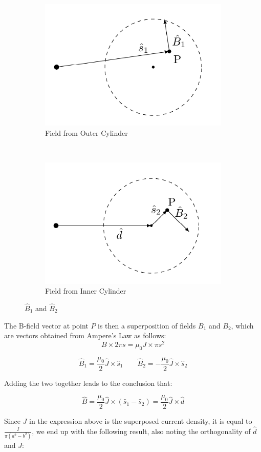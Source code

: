 \documentclass{article}
\begin{document}
\begin{figure}[ht!]
    \centering
    \begin{subfigure}[b]{0.5\textwidth}
        \centering
        \includegraphics[width=0.5\linewidth]{figures/vec1.png}
        \caption{Field from Outer Cylinder}
    \end{subfigure}%
    ~ 
    \begin{subfigure}[b]{0.5\textwidth}
        \centering
        \includegraphics[width=0.5\linewidth]{figures/vec2.png}
        \caption{Field from Inner Cylinder}
    \end{subfigure}
    \caption{$\hat{B}_1$ and $\hat{B}_2$}
\end{figure}

\newpage

 The B-field vector at point $P$ is then a superposition of fields $B_1$ and $B_2$, which are vectors obtained from Ampere's Law as follows:
\[
B\times 2\pi s = \mu_0 J \times \pi s^2 
\]

\[
\hat{B}_1 = \frac{\mu_0}{2} \hat{J}\times \hat{s}_1 \qquad \hat{B}_2 = -\frac{\mu_0}{2} \hat{J} \times \hat{s}_2
\]

Adding the two together leads to the conclusion that:

\[
\hat{B} = \frac{\mu_0}{2}\hat{J} \times(\hat{s}_1 - \hat{s}_2) = \frac{\mu_0}{2}\hat{J}\times\hat{d}
\]

Since $J$ in the expression above is the superposed current density, it is equal to $\frac{I}{\pi(a^2 - b^2)}$, we end up with the following result, also noting the orthogonality of $\hat{d}$ and $J$:
\end{document}
